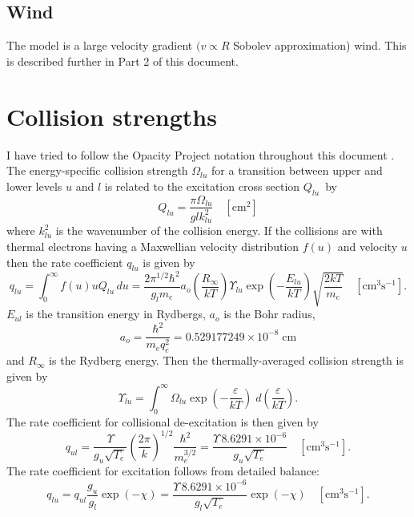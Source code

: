 \subsection{Wind }

The model is a large velocity gradient $(v\propto R$ Sobolev approximation) wind.
This is described further in Part 2 of this document.

\section{Collision strengths }

I have tried to follow the Opacity Project notation throughout this
document \citep{Lanzafame1993}.
The energy-specific collision strength
$\Omega_{lu}$ for a transition between upper and lower levels $u$ and $l$ is related to
the excitation cross section $Q_{lu}$~by
\begin{equation}
{Q_{lu}} = \frac{{\pi {\Omega _{lu}}}}{{glk_{lu}^2}}
\quad [\mathrm{cm}^2]
\end{equation}
where $k_{lu}^2$  is the wavenumber of the collision energy.
If the collisions are with
thermal electrons having a Maxwellian velocity distribution $f(u)$ and velocity
$u$ then the rate coefficient $q_{lu}$ is given by
\begin{equation}
{q_{lu}} = \int_0^\infty  {f\left( u \right)} u{Q_{lu}}\,du = \frac{{2{\pi
^{1/2}}{\hbar ^2}}}{{{g_l}{m_e}}}{a_o}\left( {\frac{{{R_\infty }}}{{kT}}}
\right){\Upsilon _{lu}}\exp \left( { - \frac{{{E_{lu}}}}{{kT}}} \right)\sqrt
{\frac{{2kT}}{{{m_e}}}}\quad
[\mathrm{cm}^3 \mathrm{s}^{-1}].
\end{equation}
$E_{ul}$ is the transition energy in Rydbergs, $a_o$ is the Bohr radius,
\begin{equation}
{a_o} = \frac{{{\hbar ^2}}}{{{m_e}q_e^2}} = 0.529177249 \times {10^{ -
8}}\;{\mathrm{cm}}
\end{equation}
and ${R_\infty }$ is the Rydberg energy.
Then the thermally-averaged collision strength is given by
\begin{equation}
{\Upsilon _{lu}} = \int_0^\infty  {{\Omega _{lu}}\exp \left( { -
\frac{\varepsilon }{{kT}}} \right)\;d\left( {\frac{\varepsilon }{{kT}}}
\right)}.
\end{equation}
The rate coefficient for collisional de-excitation is then given by
\begin{equation}
{q_{ul}} = \frac{\Upsilon }{{{g_u}\sqrt {{T_e}} }}{\left( {\frac{{2\pi
}}{k}} \right)^{1/2}}\frac{{{\hbar ^2}}}{{m_e^{3/2}}} = \frac{{\Upsilon
\,8.6291 \times {{10}^{ - 6}}}}{{{g_u}\sqrt {{T_e}} }}
\quad  [\mathrm{cm}^3 \mathrm{s}^{-1}].
\end{equation}
The rate coefficient for excitation follows from detailed balance:
\begin{equation}
{q_{lu}} = {q_{ul}}\frac{{{g_u}}}{{{g_l}}}\exp \left( { - \chi } \right)
= \frac{{\Upsilon \,8.6291 \times {{10}^{ - 6}}}}{{{g_l}\sqrt {{T_e}} }}\exp
\left( { - \chi } \right)\quad  [\mathrm{cm}^3 \mathrm{s}^{-1}].
\end{equation}

